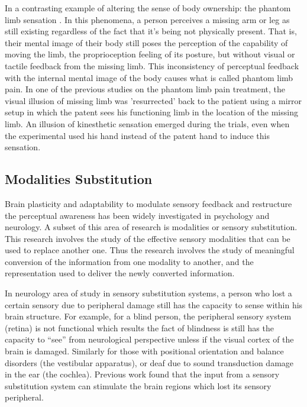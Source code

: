 In a contrasting example of altering the sense of body ownership: the phantom limb sensation \cite{melzack1992phantom}. In this phenomena, a person perceives a missing arm or leg as still existing regardless of the fact that it's being not physically present. That is, their mental image of their body still poses the perception of the capability of moving the limb, the proprioception feeling of its posture, but without visual or tactile feedback from the missing limb. This inconsistency of perceptual feedback with the internal mental image of the body causes what is called phantom limb pain. In one of the previous studies on the phantom limb pain treatment, the visual illusion of missing limb was 'resurrected' back to the patient using a mirror setup \cite{ramachandran1995touching} in which the patent sees his functioning limb in the location of the missing limb. An illusion of kinesthetic sensation emerged during the trials, even when the experimental used his hand instead of the patent hand to induce this sensation. 




\subsection{Modalities Substitution}

Brain plasticity and adaptability to modulate sensory feedback and restructure the perceptual awareness has been widely investigated in psychology and neurology. A subset of this area of research is modalities or sensory substitution. This research involves the study of the effective sensory modalities that can be used to replace another one. Thus the research involves the study of meaningful conversion of the information from one modality to another, and the representation used to deliver the newly converted information.

In neurology area of study in sensory substitution systems, a person who lost a certain sensory due to peripheral damage still has the capacity to sense within his brain structure. For example, for a blind person, the peripheral sensory system (retina) is not functional which results the fact of blindness is still has the capacity to ``see'' from neurological perspective unless if the visual cortex of the brain is damaged. Similarly for those with positional orientation and balance disorders (the vestibular apparatus), or deaf due to sound transduction damage in the ear (the cochlea). Previous work \cite{bach1972brain, bach1995nonsynaptic} found that the input from a sensory substitution system can stimulate the brain regions which lost its sensory peripheral. 

